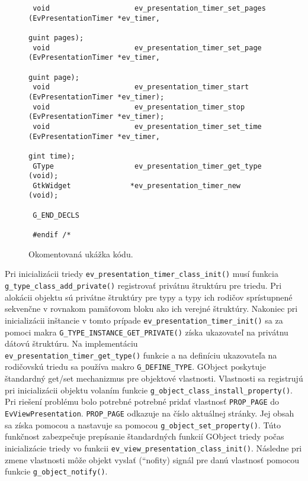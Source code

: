 \documentclass[12pt,oneside,final]{fithesis2}
\newcommand\uv[1]{\quotedblbase #1\textquotedblleft}%
\begin{document}
\begin{figure}[h]
\begin{tiny}
\begin{verbatim}
 void                    ev_presentation_timer_set_pages         (EvPresentationTimer *ev_timer,
                                                                  guint pages);
 void                    ev_presentation_timer_set_page          (EvPresentationTimer *ev_timer,
                                                                  guint page);
 void                    ev_presentation_timer_start             (EvPresentationTimer *ev_timer);
 void                    ev_presentation_timer_stop              (EvPresentationTimer *ev_timer);
 void                    ev_presentation_timer_set_time          (EvPresentationTimer *ev_timer,
                                                                  gint time);
 GType                   ev_presentation_timer_get_type          (void);
 GtkWidget              *ev_presentation_timer_new               (void);
 
 G_END_DECLS
 
 #endif /*
\end{verbatim}
\end{tiny}
\caption{Okomentovaná ukážka kódu.}
\label{ev-presentation-timer.h}
\end{figure}


Pri inicializácii triedy \verb|ev_presentation_timer_class_init()| musí funkcia \verb|g_type_class_add_private()| registrovať privátnu štruktúru pre triedu\cite{gprivate}. Pri alokácii objektu sú privátne štruktúry pre typy a typy ich rodičov sprístupnené sekvenčne v rovnakom pamäťovom bloku ako ich verejné štruktúry. Nakoniec pri inicializácii inštancie v tomto prípade \verb|ev_presentation_timer_init()| sa za pomoci makra \verb|G_TYPE_INSTANCE_GET_PRIVATE()| získa ukazovateľ na privátnu dátovú štruktúru. Na implementáciu \\
\verb|ev_presentation_timer_get_type()| funkcie a na definíciu ukazovateľa na rodičovskú triedu sa používa makro \verb|G_DEFINE_TYPE|.
GObject poskytuje štandardný get/set mechanizmus pre objektové vlastnosti. Vlastnosti sa registrujú pri inicializácii objektu volaním funkcie \verb|g_object_class_install_property()|. Pri riešení problému bolo potrebné potrebné pridať vlastnosť \verb|PROP_PAGE| do \verb|EvViewPresentation|. \verb|PROP_PAGE| odkazuje na číslo aktuálnej stránky. Jej obsah sa získa pomocou a nastavuje sa pomocou \verb|g_object_set_property()|. Túto funkčnost zabezpečuje prepísanie štandardných funkcií GObject triedy počas inicializácie triedy vo funkcii \verb|ev_view_presentation_class_init()|. Následne pri zmene vlastnosti môže objekt vyslať \uv(nofity) signál pre danú vlastnosť pomocou funkcie \verb|g_object_notify()|.
\end{document}
